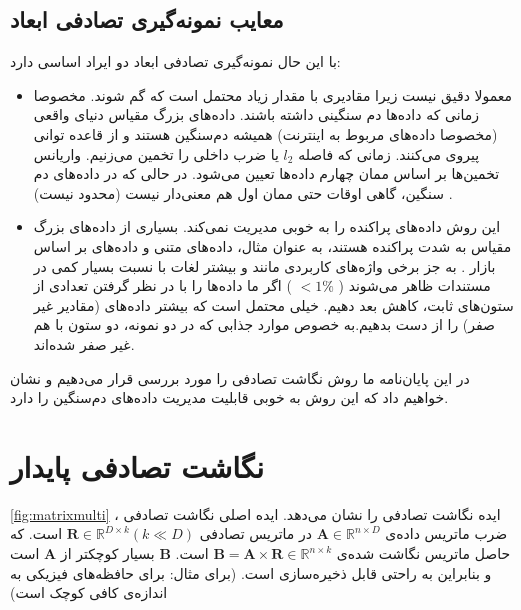 \subsection{
معایب نمونه‌گیری تصادفی ابعاد
}
با این حال نمونه‌گیری تصادفی ابعاد دو ایراد اساسی دارد:
\begin{itemize}
\item
معمولا دقیق نیست زیرا مقادیری با مقدار زیاد محتمل است که گم شوند. مخصوصا زمانی که داده‌ها دم سنگینی داشته باشند. داده‌های بزرگ مقیاس دنیای واقعی (مخصوصا داده‌های مربوط به اینترنت) همیشه دم‌سنگین هستند و از قاعده توانی پیروی می‌کنند.
\cite{litez142,litez66, litez53, litez111}
زمانی که فاصله 
$l_2$
یا ضرب داخلی را تخمین می‌زنیم. واریانس تخمین‌ها بر اساس ممان چهارم داده‌ها تعیین می‌شود. در حالی که در داده‌های دم سنگین، گاهی اوقات حتی ممان اول هم معنی‌دار نیست (محدود نیست)
\cite{litez142}
.
\item
این روش داده‌های پراکنده را به خوبی مدیریت نمی‌کند. بسیاری از داده‌های بزرگ مقیاس به شدت پراکنده هستند، به عنوان مثال، داده‌های متنی 
\cite{litez60}
و داده‌های بر اساس بازار
\cite{litez7, litez158}
. به جز برخی واژه‌های کاربردی مانند 
 و 
بیشتر لغات با نسبت بسیار کمی در مستندات ظاهر می‌شوند (
$<1\%$
)
اگر ما داده‌ها را با در نظر گرفتن تعدادی از ستون‌های ثابت، کاهش بعد دهیم. خیلی محتمل است که بیشتر داده‌های (مقادیر غیر صفر) را از دست بدهیم.به خصوص موارد جذابی که در دو نمونه، دو ستون با هم غیر صفر شده‌اند.
\end{itemize}
در این پایان‌نامه ما روش نگاشت تصادفی را مورد بررسی قرار می‌دهیم و نشان خواهیم داد که این روش به خوبی قابلیت مدیریت داده‌های دم‌سنگین را دارد.

\section{نگاشت تصادفی پایدار}
\label{sec:srp}

\autoref{fig:matrixmulti}
، ایده نگاشت تصادفی را نشان می‌دهد. ایده اصلی نگاشت تصادفی ضرب ماتریس داده‌ی 
$\mathbf{A} \in \mathbb{R}^{n \times D}$
در ماتریس تصادفی 
$\mathbf{R} \in \mathbb{R}^{D \times k} (k \ll D)$
است. که حاصل ماتریس نگاشت شده‌ی 
$\mathbf{B} = \mathbf{A} \times \mathbf{R} \in \mathbb{R}^{n \times k}$
است. 
$\mathbf{B}$
بسیار کوچکتر از 
$\mathbf{A}$
است و بنابراین به راحتی قابل ذخیره‌سازی است. (برای مثال: برای حافظه‌های فیزیکی به اندازه‌ی کافی کوچک است)

